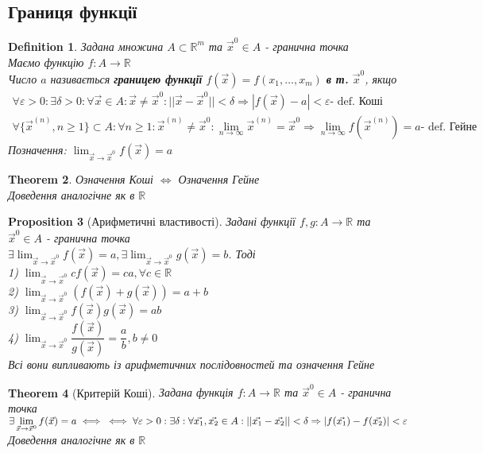\documentclass[a4paper, 14pt]{extarticle}
\def\huge{\displaystyle}
\theoremstyle{theoremdd}
\newtheorem{theorem}{Theorem}[subsection]
\theoremstyle{theoremdd}
\newtheorem{definition}[theorem]{Definition}
\theoremstyle{theoremdd}
\newtheorem{proposition}[theorem]{Proposition}
\theoremstyle{theoremdd}
\theoremstyle{theoremdd}
\theoremstyle{theoremdd}
\theoremstyle{theoremdd}
\begin{document}
\subsection{Границя функції}
\begin{definition}
Задана множина $A \subset \mathbb{R}^m$ та $\vec{x}^{0} \in A$ - гранична точка\\
Маємо функцію $f: A \to \mathbb{R}$\\
Число $a$ називається \textbf{границею функції} $f(\vec{x}) = f(x_1,\dots,x_m)$ \textbf{в т.} $\vec{x}^0$, якщо
\begin{align*}
\forall \varepsilon > 0: \exists \delta > 0: \forall \vec{x} \in A: \vec{x} \neq \vec{x}^0: ||\vec{x} - \vec{x}^0 || < \delta \Rightarrow |f(\vec{x}) - a| < \varepsilon \textrm{- def. Коші}\\
\forall \{\vec{x}^{(n)}, n \geq 1\} \subset A: \forall n \geq 1: \vec{x}^{(n)} \neq \vec{x}^0: \huge \lim_{n \to \infty} \vec{x}^{(n)} = \vec{x}^0 \Rightarrow \lim_{n \to \infty} f(\vec{x}^{(n)}) = a \textrm{- def. Гейне}
\end{align*}
Позначення: $\huge \lim_{\vec{x} \to \vec{x}^0} f(\vec{x}) = a$
\end{definition}

\begin{theorem}
Означення Коші $\iff$ Означення Гейне\\
\textit{Доведення аналогічне як в $\mathbb{R}$}
\end{theorem}

\begin{proposition}[Арифметичні властивості]
Задані функції $f,g: A \to \mathbb{R}$ та $\vec{x}^0 \in A$ - гранична точка\\
$\exists \huge \lim_{\vec{x} \to \vec{x}^0} f(\vec{x}) = a, \exists \lim_{\vec{x} \to \vec{x}^0} g(\vec{x}) = b$. Тоді\\
1) $\huge \lim_{\vec{x} \to \vec{x}^0} cf(\vec{x}) = ca, \forall c \in \mathbb{R}$\\
2) $\huge \lim_{\vec{x} \to \vec{x}^0} (f(\vec{x}) + g(\vec{x})) = a + b$\\
3) $\huge \lim_{\vec{x} \to \vec{x}^0} f(\vec{x})g(\vec{x}) = ab$\\
4) $\huge \lim_{\vec{x} \to \vec{x}^0} \dfrac{f(\vec{x})}{g(\vec{x})} = \dfrac{a}{b}, b \neq 0$\\
\textit{Всі вони випливають із арифметичних послідовностей та означення Гейне}
\end{proposition}

\begin{theorem}[Критерій Коші]
Задана функція $f: A \to \mathbb{R}$ та $\vec{x}^0 \in A$ - гранична точка\\
$\exists \huge \lim_{\vec{x} \to \vec{x}^0} f(\vec{x}) = a \iff \\ \iff \forall \varepsilon > 0: \exists \delta: \forall \vec{x_1}, \vec{x_2} \in A: ||\vec{x_1} - \vec{x_2} || < \delta \Rightarrow |f(\vec{x_1}) - f(\vec{x_2})| < \varepsilon$\\
\textit{Доведення аналогічне як в $\mathbb{R}$}
\end{theorem}
\end{document}
